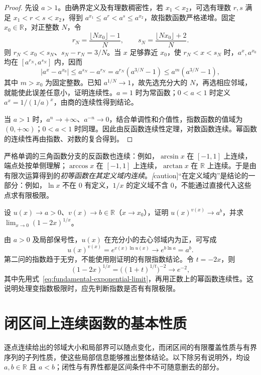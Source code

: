 \begin{proof}
先设 $a>1$。由确界定义及有理数稠密性，若 $x_1<x_2$，可选有理数 $r,s$ 满足 $x_1<r<s<x_2$，得到 $a^{x_1}\leq a^r<a^s\leq a^{x_2}$，故指数函数严格递增。固定 $x_0\in\mathbb{R}$，对正整数 $N$，令
\[
    r_N=\frac{\lfloor Nx_0\rfloor-1}{N},
    \qquad s_N=\frac{\lfloor Nx_0\rfloor+2}{N}.
\]
则 $r_N<x_0<s_N$、$s_N-r_N=3/N$。当 $x$ 足够靠近 $x_0$，使 $r_N<x<s_N$ 时，$a^x,a^{x_0}$ 均在 $[a^{r_N},a^{s_N}]$ 内，因而
\[
    |a^x-a^{x_0}|\leq a^{s_N}-a^{r_N}
    =a^{r_N}(a^{3/N}-1)\leq a^m(a^{3/N}-1),
\]
其中 $m>x_0$ 为固定整数。已知 $a^{1/N}\to1$，故先选充分大的 $N$，再选相应邻域，就能使此误差任意小，证明连续性。$a=1$ 时为常函数；$0<a<1$ 时定义 $a^x=1/(1/a)^x$，由商的连续性得到结论。

当 $a>1$ 时，$a^n\to+\infty$、$a^{-n}\to0$，结合单调性和介值性，指数函数的值域为 $(0,+\infty)$；$0<a<1$ 时同理。因此由反函数连续性定理，对数函数连续。幂函数的连续性再由指数、对数的复合得到。
\end{proof}

严格单调的三角函数分支的反函数也连续：例如，$\arcsin x$ 在 $[-1,1]$ 上连续，端点处按单侧理解；$\arccos x$ 在 $[-1,1]$ 上连续，$\arctan x$ 在 $\mathbb{R}$ 上连续。于是由有限次运算得到的\emph{初等函数在其定义域内连续}。\emph[caution]{“在定义域内”是结论的一部分：例如，$\ln x$ 不在 $0$ 有定义，$1/x$ 的定义域不含 $0$，不能通过直接代入这些点求有限极限。}

\begin{example}
\label{ex:variable-exponent-function-limit}
设 $u(x)\to a>0$、$v(x)\to b\in\mathbb{R}$（$x\to x_0$），证明 $u(x)^{v(x)}\to a^b$，并求 $\lim_{x\to0}(1-2x)^{1/x}$。
\end{example}

\begin{solve}
由 $a>0$ 及局部保号性，$u(x)$ 在充分小的去心邻域内为正，可写成
\[
    u(x)^{v(x)}=e^{v(x)\ln u(x)}\to e^{b\ln a}=a^b.
\]
第二问的指数趋于无穷，不能使用刚证明的有限指数结论。令 $t=-2x$，则
\[
    (1-2x)^{1/x}=\bigl((1+t)^{1/t}\bigr)^{-2}\to e^{-2},
\]
其中先用式~\eqref{eq:fundamental-exponential-limit}，再用正数上的幂函数连续性。这说明处理变指数极限时，应先判断指数是否有有限极限。
\end{solve}

\section{闭区间上连续函数的基本性质}
\label{sec:continuous-functions-on-closed-intervals}

逐点连续给出的邻域大小和局部界可以随点变化，而闭区间的有限覆盖性质与有界序列的子列性质，使这些局部信息能够推出整体结论。以下除另有说明外，均设 $a,b\in\mathbb{R}$ 且 $a<b$；闭性与有界性都是区间条件中不可随意删去的部分。

